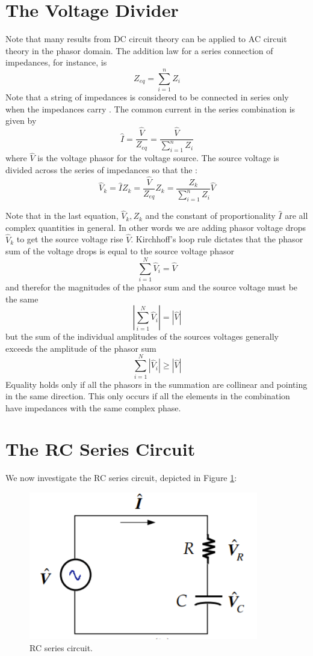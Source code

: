\documentclass[12pt, a4paper, oneside, openright, titlepage]{book}
\begin{document}
\section{The Voltage Divider}

Note that many results from DC circuit theory can be applied to AC circuit theory in the phasor domain. The addition law for a series connection of impedances, for instance, is  $$Z_{eq} = \sum_{i=1}^nZ_i$$
Note that a string of impedances is considered to be connected in series only when the impedances carry . The common current in the series combination is given by $$\hat{I} = \frac{\hat{V}}{Z_{eq}} = \frac{\hat{V}}{\sum_{i=1}^nZ_i}$$ where $\hat{V}$ is the voltage phasor for the voltage source. The source voltage is divided across the series of impedances so that the : $$\hat{V}_k = \hat{I}Z_k = \frac{\hat{V}}{Z_{eq}}Z_k = \frac{Z_k}{\sum_{i=1}^nZ_i}\hat{V}$$ 
\begin{note}
    Note that in the last equation, $\hat{V}_k,Z_k$ and the constant of proportionality $\hat{I}$ are all complex quantities in general. In other words we are adding phasor voltage drops $\hat{V}_k$ to get the source voltage rise $\hat{V}$. Kirchhoff's loop rule dictates that the phasor sum of the voltage drops is equal to the source voltage phasor $$\sum_{i=1}^N\hat{V}_i = \hat{V}$$ and therefor the magnitudes of the phasor sum and the source voltage must be the same $$\left|\sum_{i=1}^N\hat{V}_i\right| = |\hat{V}|$$ but the sum of the individual amplitudes of the sources voltages generally exceeds the amplitude of the phasor sum $$\sum_{i=1}^N|\hat{V}_i| \geq |\hat{V}|$$
    Equality holds only if all the phasors in the summation are collinear and pointing in the same direction. This only occurs if all the elements in the combination have impedances with the same complex phase.
\end{note}


\section{The RC Series Circuit}

We now investigate the RC series circuit, depicted in Figure \ref{fig:RCSeries}:

\begin{figure}[H]
    \centering
    \includegraphics[scale = 0.8]{Images/RCSeries.PNG}
    \caption{RC series circuit.}
    \label{fig:RCSeries}
\end{figure}
\end{document}
